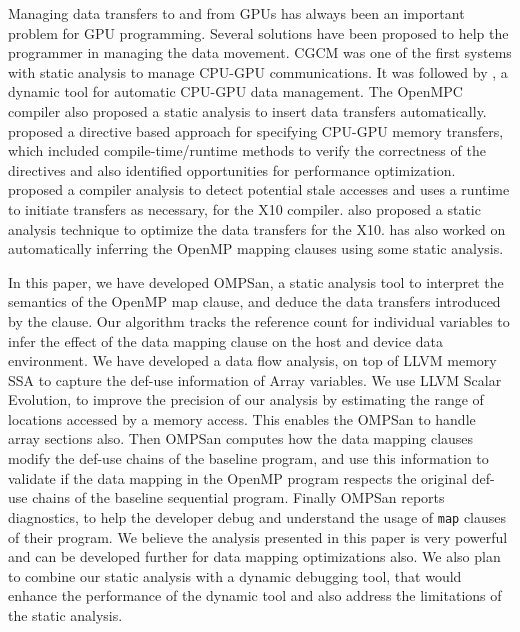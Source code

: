 \vspace*{-5pt}
Managing data transfers to and from GPUs has always been 
an important problem for GPU programming. 
Several solutions have been proposed to help 
the programmer in managing the data movement.
CGCM \cite{Jablin:2011:ACC:1993316.1993516} was one of the first
systems with static analysis to manage CPU-GPU communications. 
It was followed by \cite{Jablin:2012:DMD:2259016.2259038}, a 
dynamic tool for automatic   
CPU-GPU data management. 
The OpenMPC compiler \cite{Lee:2010:OEO:1884643.1884674} also 
proposed a static analysis to insert data transfers automatically.
\cite{6877281} proposed a directive based approach for specifying CPU-GPU memory transfers, which included compile-time/runtime methods to verify the correctness of the directives and also identified opportunities for performance optimization.
\cite{Pai:2012:FEA:2370816.2370824} proposed a compiler analysis to 
detect potential stale accesses and uses a runtime to initiate transfers as necessary, for the X10 compiler. \cite{Thangamani:2018:ORD:3243176.3243209} 
also proposed a static analysis technique to optimize 
the data transfers for the X10.
\cite{Mendonca:2017:DAA:3086564.3084540} has also worked on automatically 
inferring the OpenMP mapping clauses using some static analysis. 


In this paper, we have developed OMPSan, a static analysis 
tool to interpret the semantics of the OpenMP map clause, 
and deduce the data transfers introduced by the clause. 
Our algorithm tracks the reference count for individual variables 
to infer the effect of the data mapping clause on the host and device data 
environment.  
We have developed a data flow analysis, on top of LLVM memory 
SSA to capture the def-use information of Array variables. 
We use LLVM Scalar Evolution, to improve the precision of 
our analysis by estimating the range of locations accessed 
by a memory access. This enables the OMPSan to handle array sections also. 
Then OMPSan computes how the data mapping clauses modify 
the def-use chains of the baseline program, and use 
this information to 
validate if the data mapping in the OpenMP program respects the 
original def-use chains of the baseline sequential program. 
Finally OMPSan reports diagnostics, to help 
the developer debug and understand the usage of \texttt{map}
clauses of their program. 
We believe the analysis presented in this paper is very powerful and 
can be developed further for data mapping optimizations also.
We also plan to combine our static analysis 
with a dynamic debugging tool, that would enhance the performance 
of the dynamic tool and also address the limitations of the static analysis.
